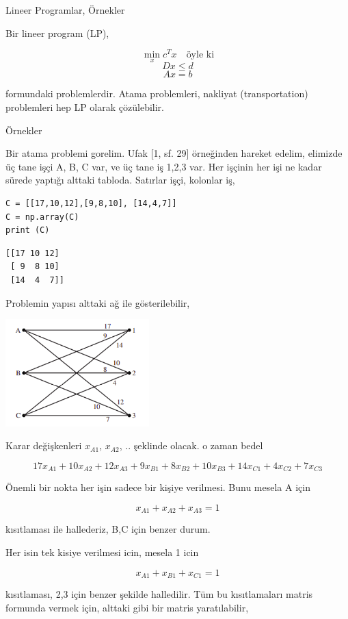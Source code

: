 \documentclass[12pt,fleqn]{article}\usepackage{../../common}
\begin{document}
Lineer Programlar, Örnekler

Bir lineer program (LP), 

$$
\min_x c^Tx \quad \textrm{öyle ki}
$$
$$
Dx \le d
$$
$$
Ax = b
$$

formundaki problemlerdir. Atama problemleri, nakliyat (transportation)
problemleri hep LP olarak çözülebilir. 

Örnekler

Bir atama problemi gorelim. Ufak [1, sf. 29] örneğinden hareket edelim,
elimizde üç tane işçi A, B, C var, ve üç tane iş 1,2,3 var. Her işçinin her
işi ne kadar sürede yaptığı alttaki tabloda. Satırlar işçi, kolonlar iş,

\begin{verbatim}
C = [[17,10,12],[9,8,10], [14,4,7]]
C = np.array(C)
print (C)
\end{verbatim}

\begin{verbatim}
[[17 10 12]
 [ 9  8 10]
 [14  4  7]]
\end{verbatim}

Problemin yapısı alttaki ağ ile gösterilebilir,

\includegraphics[width=15em]{func_90_nflow_11.png}

Karar değişkenleri $x_{A1}$, $x_{A2}$, .. şeklinde olacak. o zaman bedel

$$
17 x_{A1} + 10 x_{A2} + 12 x_{A3} + 
9 x_{B1} + 8 x_{B2} + 10 x_{B3} + 
14 x_{C1} + 4 x_{C2} + 7 x_{C3}
$$

Önemli bir nokta her işin sadece bir kişiye verilmesi. Bunu mesela A için

$$
x_{A1} + x_{A2} +  x_{A3}  = 1
$$

kısıtlaması ile hallederiz, B,C için benzer durum. 

Her isin tek kisiye verilmesi icin, mesela 1 icin

$$
x_{A1} + x_{B1} + x_{C1} = 1
$$

kısıtlaması, 2,3 için benzer şekilde halledilir. Tüm bu kısıtlamaları
matris formunda vermek için, alttaki gibi bir matris yaratılabilir,
\end{document}
